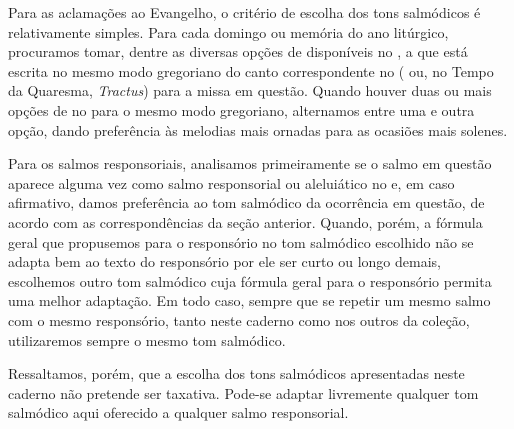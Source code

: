 Para as aclamações ao Evangelho, o critério de escolha dos tons salmódicos é relativamente simples. Para cada domingo ou memória do ano litúrgico, procuramos tomar, dentre as diversas opções de {\Al} disponíveis no {\GS}, a que está escrita no mesmo modo gregoriano do canto correspondente no {\GR} ({\Al} ou, no Tempo da Quaresma, \emph{Tractus}) para a missa em questão. Quando houver duas ou mais opções de {\Al} no {\GS} para o mesmo modo gregoriano, alternamos entre uma e outra opção, dando preferência às melodias mais ornadas para as ocasiões mais solenes.

Para os salmos responsoriais, analisamos primeiramente se o salmo em questão aparece alguma vez como salmo responsorial ou aleluiático no {\GS} e, em caso afirmativo, damos preferência ao tom salmódico da ocorrência em questão, de acordo com as correspondências da seção anterior. Quando, porém, a fórmula geral que propusemos para o responsório no tom salmódico escolhido não se adapta bem ao texto do responsório por ele ser curto ou longo demais, escolhemos outro tom salmódico cuja fórmula geral para o responsório permita uma melhor adaptação. Em todo caso, sempre que se repetir um mesmo salmo com o mesmo responsório, tanto neste caderno como nos outros da coleção, utilizaremos sempre o mesmo tom salmódico.

Ressaltamos, porém, que a escolha dos tons salmódicos apresentadas neste caderno não pretende ser taxativa. Pode-se adaptar livremente qualquer tom salmódico aqui oferecido a qualquer salmo responsorial.